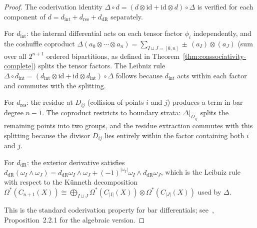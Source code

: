 \begin{proof}
The coderivation identity $\Delta \circ d = (d \otimes \mathrm{id} + \mathrm{id} \otimes d) \circ \Delta$ is verified for each component of $d = d_{\mathrm{int}} + d_{\mathrm{res}} + d_{\mathrm{dR}}$ separately.

For $d_{\mathrm{int}}$: the internal differential acts on each tensor factor $\phi_i$ independently, and the coshuffle coproduct $\Delta(a_0 \otimes \cdots \otimes a_n) = \sum_{I \sqcup J = [0,n]} \pm\, (a_I) \otimes (a_J)$ (sum over all $2^{n+1}$ ordered bipartitions, as defined in Theorem~\ref{thm:coassociativity-complete}) splits the tensor factors. The Leibniz rule $\Delta \circ d_{\mathrm{int}} = (d_{\mathrm{int}} \otimes \mathrm{id} + \mathrm{id} \otimes d_{\mathrm{int}}) \circ \Delta$ follows because $d_{\mathrm{int}}$ acts within each factor and commutes with the splitting.

For $d_{\mathrm{res}}$: the residue at $D_{ij}$ (collision of points $i$ and $j$) produces a term in bar degree $n-1$. The coproduct restricts to boundary strata: $\Delta|_{D_{ij}}$ splits the remaining points into two groups, and the residue extraction commutes with this splitting because the divisor $D_{ij}$ lies entirely within the factor containing both $i$ and $j$.

For $d_{\mathrm{dR}}$: the exterior derivative satisfies $d_{\mathrm{dR}}(\omega_I \wedge \omega_J) = d_{\mathrm{dR}}\omega_I \wedge \omega_J + (-1)^{|\omega_I|}\omega_I \wedge d_{\mathrm{dR}}\omega_J$, which is the Leibniz rule with respect to the K\"unneth decomposition $\Omega^*(C_{n+1}(X)) \cong \bigoplus_{I \sqcup J} \Omega^*(C_{|I|}(X)) \otimes \Omega^*(C_{|J|}(X))$ used by $\Delta$.

This is the standard coderivation property for bar differentials; see~\cite{LV12}, Proposition~2.2.1 for the algebraic version.
\end{proof}

